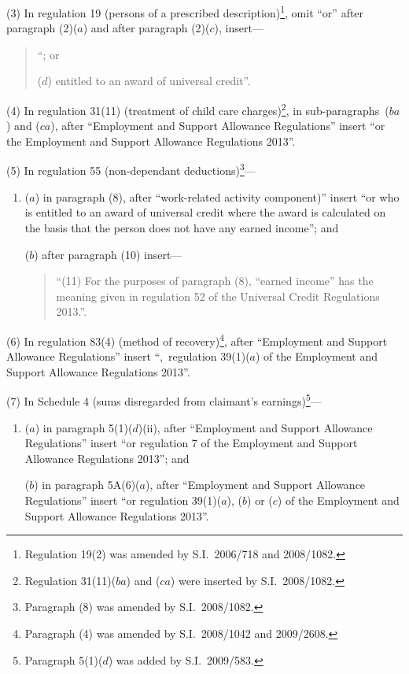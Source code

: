 \documentclass[12pt,a4paper]{article}
\begin{document}
(3) In regulation 19 (persons of a prescribed description)\footnote{Regulation 19(2) was amended by S.I.~2006/718 and 2008/1082.}, omit “or” after paragraph (2)($a$)  and after paragraph (2)($c$), insert—
\begin{quotation}
“; or

($d$) entitled to an award of universal credit”.
\end{quotation}

\begin{sloppypar}
(4) In regulation 31(11) (treatment of child care charges)\footnote{Regulation 31(11)($ba$) and ($ca$) were inserted by S.I.~2008/1082.}, in sub-paragraphs~($ba$)  and ($ca$), after “Employment and Support Allowance Regulations” insert “or the Employment and Support Allowance Regulations 2013”.
\end{sloppypar}

(5) In regulation 55 (non-dependant deductions)\footnote{Paragraph (8) was amended by S.I.~2008/1082.}—
\begin{enumerate}\item[]
($a$) in paragraph (8), after “work-related activity component)” insert “or who is entitled to an award of universal credit where the award is calculated on the basis that the person does not have any earned income”; and

($b$) after paragraph (10) insert—
\begin{quotation}
“(11) For the purposes of paragraph (8), “earned income” has the meaning given in regulation 52 of the Universal Credit Regulations 2013.”.
\end{quotation}
\end{enumerate}

(6) In regulation 83(4) (method of recovery)\footnote{Paragraph (4) was amended by S.I.~2008/1042 and 2009/2608.}, after “Employment and Support Allowance Regulations” insert “,~regulation 39(1)($a$)  of the Employment and Support Allowance Regulations 2013”.

(7) In Schedule 4 (sums disregarded from claimant’s earnings)\footnote{Paragraph 5(1)($d$) was added by S.I.~2009/583.}—
\begin{enumerate}\item[]
($a$) in paragraph 5(1)($d$)(ii), after “Employment and Support Allowance Regulations” insert “or regulation 7 of the Employment and Support Allowance Regulations 2013”; and

($b$) in paragraph 5A(6)($a$), after “Employment and Support Allowance Regulations” insert “or regulation 39(1)($a$), ($b$)  or ($c$)  of the Employment and Support Allowance Regulations 2013”.
\end{enumerate}
\end{document}
